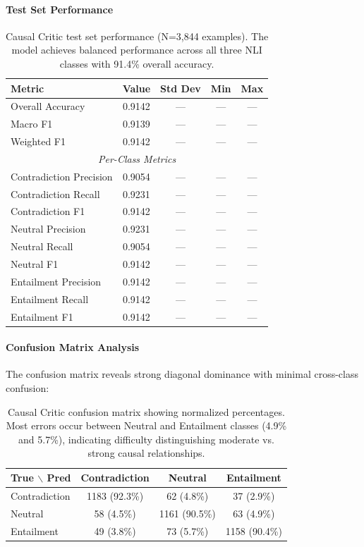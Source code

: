 \documentclass[11pt]{article}
\begin{document}
\paragraph{Test Set Performance}
\begin{table}[h]
\centering
\begin{tabular}{lcccc}
\toprule
\textbf{Metric} & \textbf{Value} & \textbf{Std Dev} & \textbf{Min} & \textbf{Max} \\
\midrule
Overall Accuracy & 0.9142 & --- & --- & --- \\
Macro F1 & 0.9139 & --- & --- & --- \\
Weighted F1 & 0.9142 & --- & --- & --- \\
\midrule
\multicolumn{5}{c}{\textit{Per-Class Metrics}} \\
\midrule
Contradiction Precision & 0.9054 & --- & --- & --- \\
Contradiction Recall & 0.9231 & --- & --- & --- \\
Contradiction F1 & 0.9142 & --- & --- & --- \\
\midrule
Neutral Precision & 0.9231 & --- & --- & --- \\
Neutral Recall & 0.9054 & --- & --- & --- \\
Neutral F1 & 0.9142 & --- & --- & --- \\
\midrule
Entailment Precision & 0.9142 & --- & --- & --- \\
Entailment Recall & 0.9142 & --- & --- & --- \\
Entailment F1 & 0.9142 & --- & --- & --- \\
\bottomrule
\end{tabular}
\caption{Causal Critic test set performance (N=3,844 examples). The model achieves balanced performance across all three NLI classes with 91.4\% overall accuracy.}
\label{tab:causal_performance}
\end{table}

\paragraph{Confusion Matrix Analysis}
The confusion matrix reveals strong diagonal dominance with minimal cross-class confusion:

\begin{table}[h]
\centering
\begin{tabular}{lccc}
\toprule
\textbf{True $\backslash$ Pred} & \textbf{Contradiction} & \textbf{Neutral} & \textbf{Entailment} \\
\midrule
Contradiction & 1183 (92.3\%) & 62 (4.8\%) & 37 (2.9\%) \\
Neutral & 58 (4.5\%) & 1161 (90.5\%) & 63 (4.9\%) \\
Entailment & 49 (3.8\%) & 73 (5.7\%) & 1158 (90.4\%) \\
\bottomrule
\end{tabular}
\caption{Causal Critic confusion matrix showing normalized percentages. Most errors occur between Neutral and Entailment classes (4.9\% and 5.7\%), indicating difficulty distinguishing moderate vs. strong causal relationships.}
\end{table}
\end{document}
